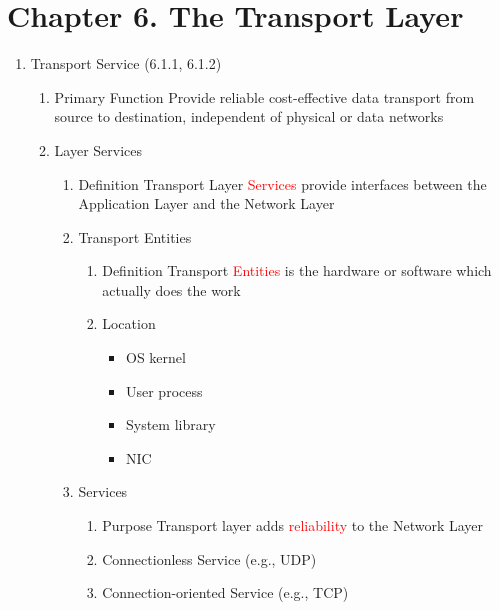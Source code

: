 \documentclass[a4paper,10pt]{article}
\newcommand{\red}[1]{\textcolor{red}{#1}}
\begin{document}
\newpage\section*{Chapter 6. The Transport Layer}
\begin{enumerate}
  \item Transport Service (6.1.1, 6.1.2)
    \begin{enumerate}
      \item Primary Function
        \newline Provide reliable cost-effective data transport from source to destination, independent of physical or data networks
      \item Layer Services
        \begin{enumerate}
          \item Definition
            \newline Transport Layer \red{Services} provide interfaces between the Application Layer and the Network Layer
          \item Transport Entities
            \begin{enumerate}
              \item Definition
                \newline Transport \red{Entities} is the hardware or software which actually does the work
              \item Location
                \begin{itemize}
                  \item OS kernel
                  \item User process
                  \item System library
                  \item NIC
                \end{itemize}
            \end{enumerate}
          \item Services
            \begin{enumerate}
              \item Purpose
                \newline Transport layer adds \red{reliability} to the Network Layer
              \item Connectionless Service (e.g., UDP)
              \item Connection-oriented Service (e.g., TCP)
            \end{enumerate}
        \end{enumerate}

\end{enumerate}
\end{enumerate}
\end{document}
